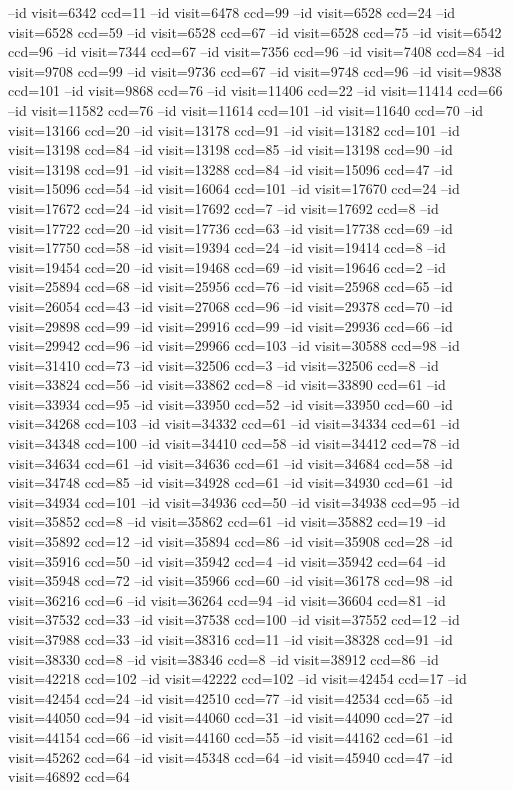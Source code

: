 --id visit=6342 ccd=11 --id visit=6478 ccd=99 --id visit=6528 ccd=24 --id visit=6528 ccd=59 --id visit=6528 ccd=67 --id visit=6528 ccd=75 --id visit=6542 ccd=96 --id visit=7344 ccd=67 --id visit=7356 ccd=96 --id visit=7408 ccd=84 --id visit=9708 ccd=99 --id visit=9736 ccd=67 --id visit=9748 ccd=96 --id visit=9838 ccd=101 --id visit=9868 ccd=76 --id visit=11406 ccd=22 --id visit=11414 ccd=66 --id visit=11582 ccd=76 --id visit=11614 ccd=101 --id visit=11640 ccd=70 --id visit=13166 ccd=20 --id visit=13178 ccd=91 --id visit=13182 ccd=101 --id visit=13198 ccd=84 --id visit=13198 ccd=85 --id visit=13198 ccd=90 --id visit=13198 ccd=91 --id visit=13288 ccd=84 --id visit=15096 ccd=47 --id visit=15096 ccd=54 --id visit=16064 ccd=101 --id visit=17670 ccd=24 --id visit=17672 ccd=24 --id visit=17692 ccd=7 --id visit=17692 ccd=8 --id visit=17722 ccd=20 --id visit=17736 ccd=63 --id visit=17738 ccd=69 --id visit=17750 ccd=58 --id visit=19394 ccd=24 --id visit=19414 ccd=8 --id visit=19454 ccd=20 --id visit=19468 ccd=69 --id visit=19646 ccd=2 --id visit=25894 ccd=68 --id visit=25956 ccd=76 --id visit=25968 ccd=65 --id visit=26054 ccd=43 --id visit=27068 ccd=96 --id visit=29378 ccd=70 --id visit=29898 ccd=99 --id visit=29916 ccd=99 --id visit=29936 ccd=66 --id visit=29942 ccd=96 --id visit=29966 ccd=103 --id visit=30588 ccd=98 --id visit=31410 ccd=73 --id visit=32506 ccd=3 --id visit=32506 ccd=8 --id visit=33824 ccd=56 --id visit=33862 ccd=8 --id visit=33890 ccd=61 --id visit=33934 ccd=95 --id visit=33950 ccd=52 --id visit=33950 ccd=60 --id visit=34268 ccd=103 --id visit=34332 ccd=61 --id visit=34334 ccd=61 --id visit=34348 ccd=100 --id visit=34410 ccd=58 --id visit=34412 ccd=78 --id visit=34634 ccd=61 --id visit=34636 ccd=61 --id visit=34684 ccd=58 --id visit=34748 ccd=85 --id visit=34928 ccd=61 --id visit=34930 ccd=61 --id visit=34934 ccd=101 --id visit=34936 ccd=50 --id visit=34938 ccd=95 --id visit=35852 ccd=8 --id visit=35862 ccd=61 --id visit=35882 ccd=19 --id visit=35892 ccd=12 --id visit=35894 ccd=86 --id visit=35908 ccd=28 --id visit=35916 ccd=50 --id visit=35942 ccd=4 --id visit=35942 ccd=64 --id visit=35948 ccd=72 --id visit=35966 ccd=60 --id visit=36178 ccd=98 --id visit=36216 ccd=6 --id visit=36264 ccd=94 --id visit=36604 ccd=81 --id visit=37532 ccd=33 --id visit=37538 ccd=100 --id visit=37552 ccd=12 --id visit=37988 ccd=33 --id visit=38316 ccd=11 --id visit=38328 ccd=91 --id visit=38330 ccd=8 --id visit=38346 ccd=8 --id visit=38912 ccd=86 --id visit=42218 ccd=102 --id visit=42222 ccd=102 --id visit=42454 ccd=17 --id visit=42454 ccd=24 --id visit=42510 ccd=77 --id visit=42534 ccd=65 --id visit=44050 ccd=94 --id visit=44060 ccd=31 --id visit=44090 ccd=27 --id visit=44154 ccd=66 --id visit=44160 ccd=55 --id visit=44162 ccd=61 --id visit=45262 ccd=64 --id visit=45348 ccd=64 --id visit=45940 ccd=47 --id visit=46892 ccd=64

